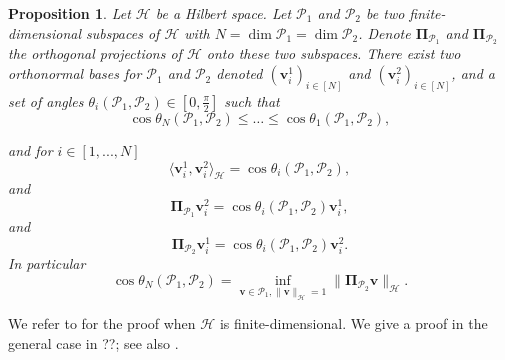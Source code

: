 \documentclass[twoside,11pt]{book}
\newtheorem{proposition}{Proposition}
\begin{document}

\begin{proposition}\label{prop:cos_between_subspaces}
Let $\mathcal{H}$ be a Hilbert space. Let $\mathcal{P}_{1}$ and $\mathcal{P}_{2}$ be two finite-dimensional subspaces of $\mathcal{H}$ with $N = \dim \mathcal{P}_{1} = \dim \mathcal{P}_{2}$. Denote $\bm{\Pi}_{\mathcal{P}_{1}}$ and $\bm{\Pi}_{\mathcal{P}_{2}}$ the orthogonal projections of $\mathcal{H}$ onto these two subspaces. There exist two orthonormal bases for $\mathcal{P}_{1}$ and $\mathcal{P}_{2}$ denoted $(\bm{v}_{i}^{1})_{i \in [N]}$ and $(\bm{v}_{i}^{2})_{i \in [N]}$, and a set of angles $\theta_{i}(\mathcal{P}_{1},\mathcal{P}_{2}) \in [0,\frac{\pi}{2}]$ such that
\begin{equation}
\cos \theta_{N}(\mathcal{P}_{1},\mathcal{P}_{2}) \leq \dots \leq \cos \theta_{1}(\mathcal{P}_{1},\mathcal{P}_{2}) ,
\end{equation}


and for $i \in [1,...,N]$
\begin{equation}
\langle \bm{v}_{i}^{1}, \bm{v}_{i}^{2} \rangle_{\mathcal{H}} = \cos \theta_{i}(\mathcal{P}_{1},\mathcal{P}_{2}),
\end{equation}
and
\begin{equation}\label{eq:principal_vectors_projection_relationship}
 \bm{\Pi}_{\mathcal{P}_{1}}\bm{v}_{i}^{2} = \cos \theta_{i}(\mathcal{P}_{1},\mathcal{P}_{2}) \bm{v}_{i}^{1},
\end{equation}
and
\begin{equation}
 \bm{\Pi}_{\mathcal{P}_{2}}\bm{v}_{i}^{1} = \cos \theta_{i}(\mathcal{P}_{1},\mathcal{P}_{2}) \bm{v}_{i}^{2}.
\end{equation}
In particular
\begin{equation}\label{eq:costhetaN}
\cos \theta_{N}(\mathcal{P}_{1},\mathcal{P}_{2}) = \inf\limits_{\bm{v} \in \mathcal{P}_{1},\|\bm{v}\|_{\mathcal{H}} = 1} \|\bm{\Pi}_{\mathcal{P}_{2}}\bm{v}\|_{\mathcal{H}}.
\end{equation}
\end{proposition}
We refer to \cite{GoVa12} for the proof when $\mathcal{H}$ is finite-dimensional. We give a proof in the general case in ??; see also \cite{DaKa70}.
\end{document}
